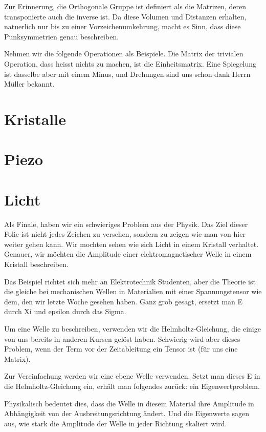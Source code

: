 \documentclass[a4paper]{article}
\newcommand{\scene}[1]{\par\noindent[ #1 ]\par}
\begin{document}
Zur Erinnerung, die Orthogonale Gruppe ist definiert als die Matrizen, deren
transponierte auch die inverse ist. Da diese Volumen und Distanzen erhalten,
natuerlich nur bis zu einer Vorzeichenumkehrung, macht es Sinn, dass diese
Punksymmetrien genau beschreiben.

Nehmen wir die folgende Operationen als Beispiele. Die Matrix der trivialen
Operation, dass heisst nichts zu machen, ist die Einheitsmatrix. Eine
Spiegelung ist dasselbe aber mit einem Minus, und Drehungen sind uns schon
dank Herrn M\"uller bekannt.

\section{Kristalle}
\scene{Spontan}

\section{Piezo}
\scene{Spontan}

\section{Licht}
Als Finale, haben wir ein schwieriges Problem aus der Physik. Das Ziel dieser
Folie ist nicht jedes Zeichen zu versehen, sondern zu zeigen wie man von hier
weiter gehen kann. Wir mochten sehen wie sich Licht in einem Kristall verhaltet.
Genauer, wir m\"ochten die Amplitude einer
elektromagnetischer Welle in einem Kristall beschreiben.

Das Beispiel richtet sich mehr an Elektrotechnik Studenten, aber die Theorie
ist die gleiche bei mechanischen Wellen in Materialien mit einer
Spannungstensor wie dem, den wir letzte Woche gesehen haben. Ganz grob gesagt,
ersetzt man E durch Xi und epsilon durch das Sigma.

Um eine Welle zu beschreiben, verwenden wir die Helmholtz-Gleichung, die einige
von uns bereits in anderen Kursen gel\"ost haben.  Schwierig wird aber dieses
Problem, wenn der Term vor der Zeitableitung ein Tensor ist (f\"ur uns eine Matrix).

Zur Vereinfachung werden wir eine ebene Welle verwenden. Setzt man dieses E in
die Helmholtz-Gleichung ein, erhält man folgendes zurück: ein Eigenwertproblem.

Physikalisch bedeutet dies, dass die Welle in diesem Material ihre Amplitude in
Abhängigkeit von der Ausbreitungsrichtung ändert.  Und die Eigenwerte sagen
aus, wie stark die Amplitude der Welle in jeder Richtung skaliert wird.
\end{document}
